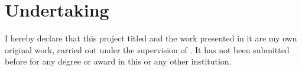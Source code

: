 \chapter*{Undertaking}

I hereby declare that this project titled \textbf{\thesistitle} and the work presented in it are my own original work, carried out under the supervision of \supervisorname. It has not been submitted before for any degree or award in this or any other institution.

\vspace{1.0cm}


